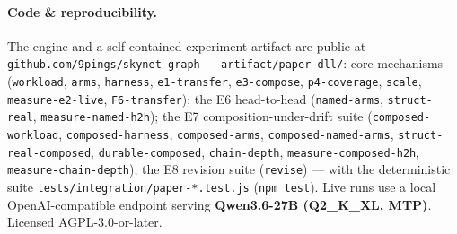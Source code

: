 \documentclass[11pt]{article}
\begin{document}
\paragraph{Code \& reproducibility.} The engine and a self-contained experiment artifact are public at
\texttt{github.com/9pings/skynet-graph} --- \texttt{artifact/paper-dll/}: core mechanisms (\texttt{workload},
\texttt{arms}, \texttt{harness}, \texttt{e1-transfer}, \texttt{e3-compose}, \texttt{p4-coverage}, \texttt{scale},
\texttt{measure-e2-live}, \texttt{F6-transfer}); the E6 head-to-head (\texttt{named-arms}, \texttt{struct-real},
\texttt{measure-named-h2h}); the E7 composition-under-drift suite (\texttt{composed-workload},
\texttt{composed-harness}, \texttt{composed-arms}, \texttt{composed-named-arms}, \texttt{struct-real-composed},
\texttt{durable-composed}, \texttt{chain-depth}, \texttt{measure-composed-h2h}, \texttt{measure-chain-depth}); the
E8 revision suite (\texttt{revise}) --- with the deterministic suite \texttt{tests/integration/paper-*.test.js}
(\texttt{npm test}). Live runs use a local OpenAI-compatible endpoint serving \textbf{Qwen3.6-27B (Q2\_K\_XL, MTP)}.
Licensed AGPL-3.0-or-later.
\end{document}
